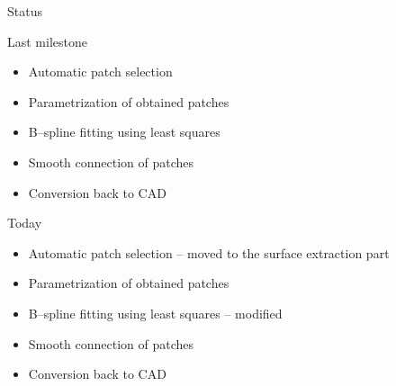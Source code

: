 \begin{frame}{Status}
\begin{block}{Last milestone}
\begin{itemize}
	\item[\textcolor{red}{\XSolidBrush}] Automatic patch selection
	\item[\textcolor{red}{\XSolidBrush}] Parametrization of obtained patches
	\item[\textcolor{green}{\Checkmark}] B--spline fitting using least squares
	\item[\textcolor{black}{\VarClock}] Smooth connection of patches
	\item[\textcolor{red}{\XSolidBrush}] Conversion back to CAD
\end{itemize}
\end{block}
\begin{block}{Today}
\begin{itemize}
	\item[\textcolor{green}{\Checkmark}] Automatic patch selection -- {\color{gray}moved to the surface extraction part}
	\item[\textcolor{green}{\Checkmark}] Parametrization of obtained patches 
	\item[\textcolor{green}{\Checkmark}] B--spline fitting using least squares --  {\color{gray}modified}
	\item[\textcolor{green}{\Checkmark}] Smooth connection of patches
	\item[\textcolor{red}{\XSolidBrush}] Conversion back to CAD
\end{itemize}
\end{block}
\end{frame}
